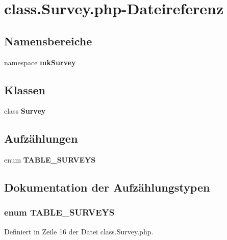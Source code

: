 \section{class.Survey.php-Dateireferenz}
\label{class_8Survey_8php}
\subsection*{Namensbereiche}
\begin{CompactItemize}
\item 
namespace {\bf mkSurvey}
\end{CompactItemize}
\subsection*{Klassen}
\begin{CompactItemize}
\item 
class {\bf Survey}
\end{CompactItemize}
\subsection*{Aufzählungen}
\begin{CompactItemize}
\item 
enum {\bf TABLE\_\-SURVEYS} 
\end{CompactItemize}


\subsection{Dokumentation der Aufzählungstypen}
\subsubsection{\setlength{\rightskip}{0pt plus 5cm}enum {\bf TABLE\_\-SURVEYS}}\label{class_8Survey_8php_274281b2d2cb5424c41fa5c0f1b03d0d}




Definiert in Zeile 16 der Datei class.Survey.php.